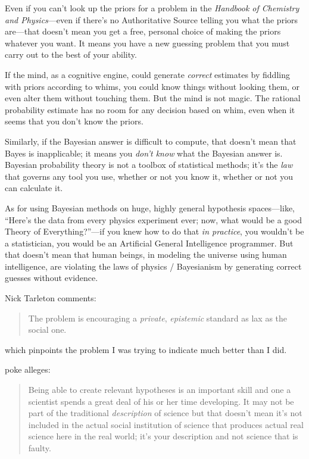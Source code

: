 {
 Even if you can't look up the priors for a problem
in the \textit{Handbook of Chemistry and Physics}{}---even if
there's no Authoritative Source telling you what the
priors are---that doesn't mean you get a free, personal
choice of making the priors whatever you want. It means you have a new
guessing problem that you must carry out to the best of your ability.}

{
 If the mind, as a cognitive engine, could generate
\textit{correct} estimates by fiddling with priors according to whims,
you could know things without looking them, or even alter them without
touching them. But the mind is not magic. The rational probability
estimate has no room for any decision based on whim, even when it seems
that you don't know the priors.}

{
 Similarly, if the Bayesian answer is difficult to compute, that
doesn't mean that Bayes is inapplicable; it means you
\textit{don't know} what the Bayesian answer is.
Bayesian probability theory is not a toolbox of statistical methods;
it's the \textit{law} that governs any tool you use,
whether or not you know it, whether or not you can calculate it.}

{
 As for using Bayesian methods on huge, highly general hypothesis
spaces---like, ``Here's the data from
every physics experiment ever; now, what would be a good Theory of
Everything?''---if you knew how to do that \textit{in
practice}, you wouldn't be a statistician, you would be
an Artificial General Intelligence programmer. But that
doesn't mean that human beings, in modeling the
universe using human intelligence, are violating the laws of physics /
Bayesianism by generating correct guesses without evidence.}

{
 Nick Tarleton comments:}

\begin{quote}
{
 The problem is encouraging a \textit{private}, \textit{epistemic}
 standard as lax as the social one.}
\end{quote}

{
 which pinpoints the problem I was trying to indicate much better
than I did.}

\myendsectiontext


{
 poke alleges:}

\begin{quote}
{
 Being able to create relevant hypotheses is an important skill and
one a scientist spends a great deal of his or her time developing. It
may not be part of the traditional \textit{description} of science but
that doesn't mean it's not included in
the actual social institution of science that produces actual real
science here in the real world; it's your description
and not science that is faulty.}
\end{quote}

